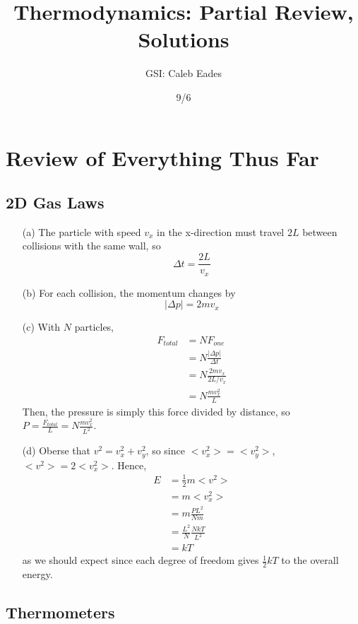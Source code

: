 \documentclass{article}
\begin{document}
	
\title{Thermodynamics: Partial Review, Solutions}
\author{GSI: Caleb Eades}
\date{9/6}
\maketitle

\section{Review of Everything Thus Far}

\subsection{2D Gas Laws}

\begin{itemize}
	\item[(a)] The particle with speed $v_x$ in the x-direction must travel $2L$ between collisions with the same wall, so
	\begin{equation}
	\Delta t = \frac{2L}{v_x}
	\end{equation}
	\item[(b)] For each collision, the momentum changes by
	\begin{equation}
	|\Delta p| = 2mv_x
	\end{equation}
	\item[(c)] With $N$ particles,
	\begin{align*}
	F_{total} &= NF_{one} \\
	&= N\frac{|\Delta p|}{\Delta t} \\
	&= N\frac{2mv_x}{2L/v_x} \\
	&= N\frac{mv_x^2}{L}
	\end{align*}
	Then, the pressure is simply this force divided by distance, so $P = \frac{F_{total}}{L} = N\frac{mv_x^2}{L^2}$.
	\item[(d)] Oberse that $v^2 = v_x^2 + v_y^2$, so since $<v_x^2> = <v_y^2>$, $<v^2> = 2<v_x^2>$. Hence,
	\begin{align*}
	E &= \frac{1}{2}m<v^2> \\
	&= m<v_x^2> \\
	&= m\frac{PL^2}{Nm} \\
	&= \frac{L^2}{N}\frac{NkT}{L^2} \\
	&= kT
	\end{align*}
	as we should expect since each degree of freedom gives $\frac{1}{2}kT$ to the overall energy.
\end{itemize}

\subsection{Thermometers}
\end{document}
